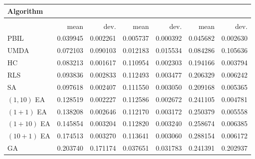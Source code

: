 \begin{tabular}{@{} l *{6}{>{{}}N{1}{2}} @{}}
\toprule
{Algorithm} &  \\
\midrule
&  &  &  \\
\midrule
& {mean} & {dev.} & {mean} & {dev.} & {mean} & {dev.} \\
\midrule
PBIL & 0.039945 & 0.002261 & 0.005737 & 0.000392 & 0.045682 & 0.002630 \\
UMDA & 0.072103 & 0.090103 & 0.012183 & 0.015534 & 0.084286 & 0.105636 \\
HC & 0.083213 & 0.001617 & 0.110954 & 0.002303 & 0.194166 & 0.003794 \\
RLS & 0.093836 & 0.002833 & 0.112493 & 0.003477 & 0.206329 & 0.006242 \\
SA & 0.097618 & 0.002407 & 0.111550 & 0.003050 & 0.209168 & 0.005365 \\
$(1,10)$ EA & 0.128519 & 0.002227 & 0.112586 & 0.002672 & 0.241105 & 0.004781 \\
$(1+1)$ EA & 0.138208 & 0.002646 & 0.112170 & 0.003172 & 0.250379 & 0.005558 \\
$(1+10)$ EA & 0.145854 & 0.003204 & 0.112820 & 0.003240 & 0.258674 & 0.006385 \\
$(10+1)$ EA & 0.174513 & 0.003270 & 0.113641 & 0.003060 & 0.288154 & 0.006172 \\
GA & 0.203740 & 0.171174 & 0.037651 & 0.031783 & 0.241391 & 0.202937 \\
\bottomrule
\end{tabular}
